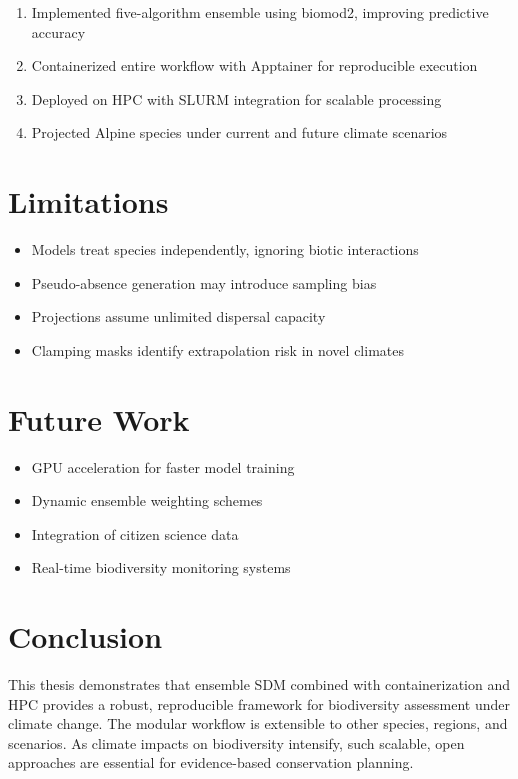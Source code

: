 \documentclass[12pt,a4paper]{report}
\begin{document}
\begin{enumerate}
    \item Implemented five-algorithm ensemble using biomod2, improving predictive accuracy
    \item Containerized entire workflow with Apptainer for reproducible execution
    \item Deployed on HPC with SLURM integration for scalable processing
    \item Projected Alpine species under current and future climate scenarios
\end{enumerate}

\section{Limitations}

\begin{itemize}
    \item Models treat species independently, ignoring biotic interactions
    \item Pseudo-absence generation may introduce sampling bias
    \item Projections assume unlimited dispersal capacity
    \item Clamping masks identify extrapolation risk in novel climates
\end{itemize}

\section{Future Work}

\begin{itemize}
    \item GPU acceleration for faster model training
    \item Dynamic ensemble weighting schemes
    \item Integration of citizen science data
    \item Real-time biodiversity monitoring systems
\end{itemize}

\section{Conclusion}

This thesis demonstrates that ensemble SDM combined with containerization and HPC provides a robust, reproducible framework for biodiversity assessment under climate change. The modular workflow is extensible to other species, regions, and scenarios. As climate impacts on biodiversity intensify, such scalable, open approaches are essential for evidence-based conservation planning.
\end{document}
